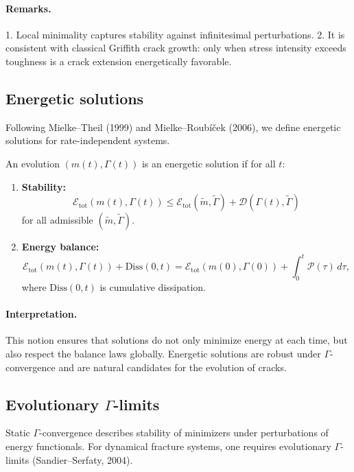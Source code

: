 \paragraph{Remarks.}
1. Local minimality captures stability against infinitesimal perturbations.  
2. It is consistent with classical Griffith crack growth: only when stress intensity exceeds toughness is a crack extension energetically favorable.

\subsection{Energetic solutions}
Following Mielke--Theil (1999) and Mielke--Roubíček (2006), 
we define energetic solutions for rate-independent systems.

\begin{definition}
An evolution $(m(t),\Gamma(t))$ is an energetic solution if for all $t$:
\begin{enumerate}[label=(E\arabic*)]
  \item \textbf{Stability:}
  \[
    \mathcal{E}_{\mathrm{tot}}(m(t),\Gamma(t)) \leq \mathcal{E}_{\mathrm{tot}}(\tilde m,\tilde\Gamma) + \mathcal{D}(\Gamma(t),\tilde\Gamma)
  \]
  for all admissible $(\tilde m,\tilde\Gamma)$.
  \item \textbf{Energy balance:}
  \[
    \mathcal{E}_{\mathrm{tot}}(m(t),\Gamma(t)) + \mathrm{Diss}(0,t) = \mathcal{E}_{\mathrm{tot}}(m(0),\Gamma(0)) + \int_0^t \mathcal{P}(\tau)\,d\tau,
  \]
  where $\mathrm{Diss}(0,t)$ is cumulative dissipation.
\end{enumerate}
\end{definition}

\paragraph{Interpretation.}
This notion ensures that solutions do not only minimize energy at each time, but also respect the balance laws globally.  
Energetic solutions are robust under $\Gamma$-convergence and are natural candidates for the evolution of cracks.

\subsection{Evolutionary $\Gamma$-limits}
Static $\Gamma$-convergence describes stability of minimizers under perturbations of energy functionals. 
For dynamical fracture systems, one requires evolutionary $\Gamma$-limits (Sandier--Serfaty, 2004).

